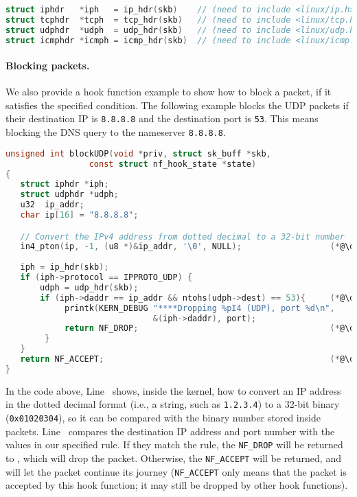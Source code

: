 \begin{lstlisting}[language=C]
struct iphdr   *iph   = ip_hdr(skb)    // (need to include <linux/ip.h>) 
struct tcphdr  *tcph  = tcp_hdr(skb)   // (need to include <linux/tcp.h>) 
struct udphdr  *udph  = udp_hdr(skb)   // (need to include <linux/udp.h>) 
struct icmphdr *icmph = icmp_hdr(skb)  // (need to include <linux/icmp.h>) 
\end{lstlisting}
 

\paragraph{Blocking packets.} 
We also provide a hook function example to show how 
to block a packet, if it satisfies the specified 
condition. The following example blocks the 
UDP packets if their destination IP is \texttt{8.8.8.8} 
and the destination port is \texttt{53}. This means 
blocking the DNS query to the nameserver \texttt{8.8.8.8}. 

\begin{lstlisting}[language=C, caption={Code example: blocking UDP}]
unsigned int blockUDP(void *priv, struct sk_buff *skb,
                 const struct nf_hook_state *state)
{
   struct iphdr *iph;
   struct udphdr *udph;
   u32  ip_addr;
   char ip[16] = "8.8.8.8";

   // Convert the IPv4 address from dotted decimal to a 32-bit number
   in4_pton(ip, -1, (u8 *)&ip_addr, '\0', NULL);                  (*@\ding{202}@*)
   
   iph = ip_hdr(skb);
   if (iph->protocol == IPPROTO_UDP) {
       udph = udp_hdr(skb);                                         
       if (iph->daddr == ip_addr && ntohs(udph->dest) == 53){     (*@\ding{203}@*)
            printk(KERN_DEBUG "****Dropping %pI4 (UDP), port %d\n", 
                              &(iph->daddr), port);                 
            return NF_DROP;                                       (*@\ding{204}@*)
        }
   }
   return NF_ACCEPT;                                              (*@\ding{205}@*)
}
\end{lstlisting}


In the code above, Line~ shows, inside the kernel, 
how to convert an IP address 
in the dotted decimal format (i.e., a string, such as \texttt{1.2.3.4})
to a 32-bit binary (\texttt{0x01020304}), 
so it can be compared with the binary number stored inside packets. 
Line~ compares the destination IP address and port 
number with the values in our specified rule. If they match the 
rule, the \texttt{NF\_DROP} will be returned to \netfilter,
which will drop the packet. Otherwise, the \texttt{NF\_ACCEPT}
will be returned, and \netfilter will let the packet 
continue its journey (\texttt{NF\_ACCEPT} only means 
that the packet is accepted by this hook function; it may still be 
dropped by other hook functions). 


